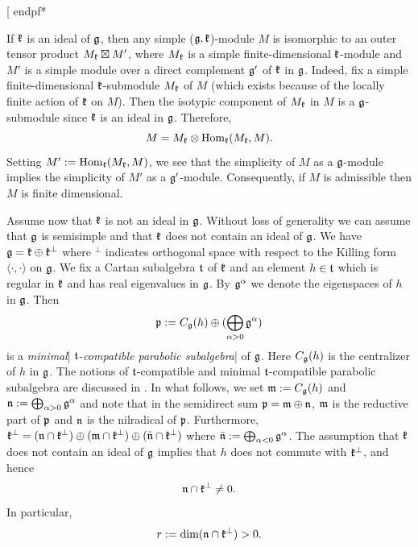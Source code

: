 \documentclass[12pt]{amsart}
\makeatletter
\def\mathfrak{\frak}
\newenvironment{proof}{%
         \@ifnextchar[{%
                       \expandafter\let\expandafter\end@proof
                         \csname endpf*\endcsname
                         \my@proof
                      }{\let\end@proof\endpf\pf}%
        }{\end@proof}
\def\my@proof[#1]{\@nameuse{pf*}{#1}}
\def\emph#1{{\em #1}}
\def\@putname#1#2#3#4{\def\@@ref{#3}\let\old@bf\bf
        \def\bf##1{\old@bf\if?\noexpand##1?{#4}\else##1\fi}%
        #1{#2}%
        \let\bf\old@bf}
\def\@putname#1#2#3#4{\def\@@ref{#3}\let\old@bf\bf    %
        \let\old@reset@font\reset@font                  %
        \def\bf##1{\old@bf\if?\noexpand##1?{#4}\else##1\fi}%
        \def\reset@font##1##2{\old@reset@font##1\if?\noexpand##2?{#4}\else##2\fi}#1{#2}%
        \let\bf\old@bf\let\reset@font\old@reset@font}
\let\my@cite=\cite
\def\cite#1{\@putname\my@cite{#1}{\@citeb}{\tiny\rm\@@ref}}
\theoremstyle{plain} %
\let\emphOrig\emph
\def\eatToBar#1|{}
\def\emphToIndexSLASH#1\/{\index{#1}\eatToBar}
\def\emphToIndexDOTSLASH#1.\/{\emphToIndexSLASH #1\/}
\def\emphAndIndex#1{\emphOrig{#1}{\emphToIndexDOTSLASH #1.\/|}}
\let\emph\emphAndIndex
\numberwithin{equation}{section}
\theoremstyle{definition}
\theoremstyle{remark}
\theoremstyle{plain} %
\newcommand{\fg}{\mathfrak{g}}
\newcommand{\fk}{\mathfrak{k}}
\newcommand{\fn}{\mathfrak{n}}
\makeatother
\begin{document}
\begin{proof}
If $\fk$ is an ideal of $\fg$, then any simple  ($\fg,\fk$)-module $M$ is isomorphic to an outer tensor product $M_{\fk}\boxtimes M'$, where $M_{\fk}$ is a simple finite-dimensional $\fk$-module and $M'$ is a simple module over a direct complement $\fg'$ of $\fk$ in $\fg$. Indeed, fix a simple finite-dimensional $\fk$-submodule $M_{\fk}$ of $M$ (which exists because of the locally finite action of $\fk$ on $M$). Then the isotypic component of $M_{\fk}$ in $M$ is  a $\fg$-submodule since $\fk$ is an ideal in $\fg$. Therefore,
$$M=M_{\fk}\otimes\textup{Hom}_{\fk}(M_{\fk},M).$$
Setting $M':=\textup{Hom}_{\fk}(M_{\fk},M)$, we see that the simplicity of $M$ as a $\fg$-module implies the simplicity of $M'$ as a $\fg'$-module.
 Consequently, if $M$ is admissible then $M$ is finite dimensional.


Assume now that $\fk$ is not an ideal in $\fg$. Without loss of generality we can assume that $\fg$ is semisimple and that $\fk$ does not contain an ideal of $\fg$. We have $\fg=\fk\oplus\fk^{\perp}$ where $^\perp$ indicates orthogonal space with respect to the Killing form $\langle\cdot,\cdot\rangle$ on $\fg$. We fix a Cartan subalgebra $\mathfrak{t}$ of $\fk$ and an element $h\in \mathfrak{t}$ which is regular in $\fk$ and has real eigenvalues in  $\fg$. By $\fg^{\alpha}$ we denote the eigenspaces of $h$ in $\fg$.  Then 
$$ \mathfrak{p}:=C_{\fg}(h)\oplus(\bigoplus_{\alpha>0}\fg^{\alpha})$$
is a \emph{minimal} $\mathfrak{t}$-\emph{compatible parabolic subalgebra} of $\fg$. Here $C_{\fg}(h)$ is the centralizer of $h$ in $\fg$. The notions of $\mathfrak{t}$-compatible and minimal $\mathfrak{t}$-compatible parabolic subalgebra are discussed in \cite{PZ1}. In what follows, we set $\mathfrak{m}:=C_{\fg}(h)$ and $\fn:=\bigoplus_{\alpha>0}\fg^\alpha$ and note that in the semidirect sum $\mathfrak{p}=\mathfrak{m}\oplus\fn$, $\mathfrak{m}$ is the reductive part of $\mathfrak{p}$ and $\fn$ is the nilradical of $\mathfrak{p}$. Furthermore, $\fk^{\perp}=(\fn\cap\fk^{\perp})\oplus(\mathfrak{m}\cap\fk^{\perp})\oplus(\bar{\fn}\cap\fk^{\perp})$ where $\bar{\fn}:=\bigoplus_{\alpha<0}\fg^{\alpha}$. The assumption that $\fk$ does not contain an ideal of $\fg$ implies that $h$ does not commute with $\fk^{\perp}$, and hence
$$\fn\cap\fk^{\perp}\neq0.$$
In particular,
$$r:=\textup{dim}(\fn\cap\fk^{\perp})>0.$$


\end{proof}
\end{document}
